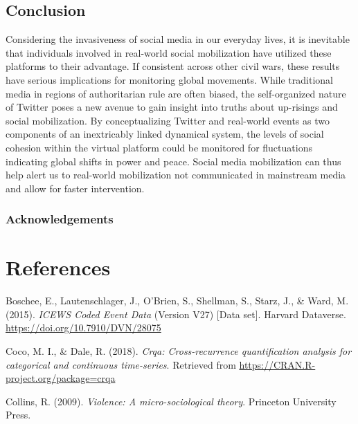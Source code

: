 \documentclass[english,man]{apa6}
\begin{document}
\hypertarget{conclusion}{%
\subsection{Conclusion}\label{conclusion}}

Considering the invasiveness of social media in our everyday lives, it is inevitable that individuals involved in real-world social mobilization have utilized these platforms to their advantage. If consistent across other civil wars, these results have serious implications for monitoring global movements. While traditional media in regions of authoritarian rule are often biased, the self-organized nature of Twitter poses a new avenue to gain insight into truths about up-risings and social mobilization. By conceptualizing Twitter and real-world events as two components of an inextricably linked dynamical system, the levels of social cohesion within the virtual platform could be monitored for fluctuations indicating global shifts in power and peace. Social media mobilization can thus help alert us to real-world mobilization not communicated in mainstream media and allow for faster intervention.

\hypertarget{acknowledgements}{%
\subsubsection{Acknowledgements}\label{acknowledgements}}

\newpage

\hypertarget{references}{%
\section{References}\label{references}}

\begingroup
\setlength{\parindent}{-0.5in}
\setlength{\leftskip}{0.5in}

\hypertarget{refs}{}
\leavevmode\hypertarget{ref-DVNux2f28075_2015}{}%
Boschee, E., Lautenschlager, J., O'Brien, S., Shellman, S., Starz, J., \& Ward, M. (2015). \emph{ICEWS Coded Event Data} (Version V27) {[}Data set{]}. Harvard Dataverse. \url{https://doi.org/10.7910/DVN/28075}

\leavevmode\hypertarget{ref-R-crqa}{}%
Coco, M. I., \& Dale, R. (2018). \emph{Crqa: Cross-recurrence quantification analysis for categorical and continuous time-series}. Retrieved from \url{https://CRAN.R-project.org/package=crqa}

\leavevmode\hypertarget{ref-collins2009violence}{}%
Collins, R. (2009). \emph{Violence: A micro-sociological theory}. Princeton University Press.
\end{document}

